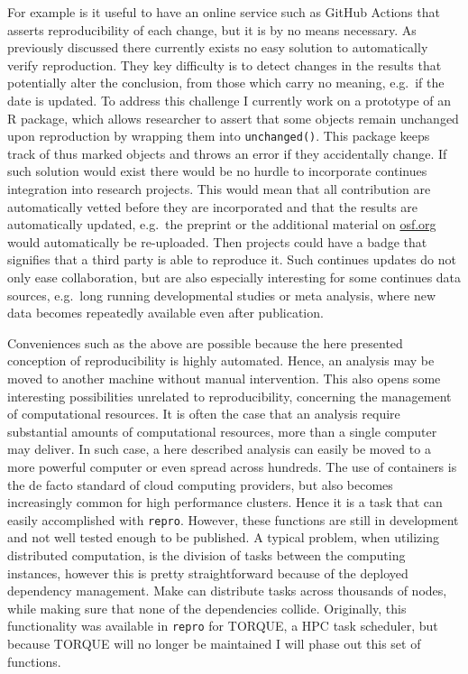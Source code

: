 \documentclass[12pt,a4paper,]{article}
\begin{document}
For example is it useful to have an online service such as GitHub Actions that asserts reproducibility of each change, but it is by no means necessary.
As previously discussed there currently exists no easy solution to automatically verify reproduction.
They key difficulty is to detect changes in the results that potentially alter the conclusion, from those which carry no meaning, e.g.~if the date is updated.
To address this challenge I currently work on a prototype of an R package, which allows researcher to assert that some objects remain unchanged upon reproduction by wrapping them into \texttt{unchanged()}.
This package keeps track of thus marked objects and throws an error if they accidentally change.
If such solution would exist there would be no hurdle to incorporate continues integration into research projects.
This would mean that all contribution are automatically vetted before they are incorporated and that the results are automatically updated, e.g.~the preprint or the additional material on \url{osf.org} would automatically be re-uploaded.
Then projects could have a badge that signifies that a third party is able to reproduce it.
Such continues updates do not only ease collaboration, but are also especially interesting for some continues data sources, e.g.~long running developmental studies or meta analysis, where new data becomes repeatedly available even after publication.

Conveniences such as the above are possible because the here presented conception of reproducibility is highly automated.
Hence, an analysis may be moved to another machine without manual intervention.
This also opens some interesting possibilities unrelated to reproducibility, concerning the management of computational resources.
It is often the case that an analysis require substantial amounts of computational resources, more than a single computer may deliver.
In such case, a here described analysis can easily be moved to a more powerful computer or even spread across hundreds.
The use of containers is the de facto standard of cloud computing providers, but also becomes increasingly common for high performance clusters.
Hence it is a task that can easily accomplished with \texttt{repro}.
However, these functions are still in development and not well tested enough to be published.
A typical problem, when utilizing distributed computation, is the division of tasks between the computing instances, however this is pretty straightforward because of the deployed dependency management.
Make can distribute tasks across thousands of nodes, while making sure that none of the dependencies collide.
Originally, this functionality was available in \texttt{repro} for TORQUE, a HPC task scheduler, but because TORQUE will no longer be maintained I will phase out this set of functions.
\end{document}

